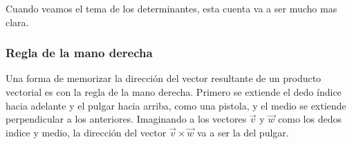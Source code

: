 \documentclass[../teoria.root.tex]{subfiles}
\begin{document}
Cuando veamos el tema de los determinantes, esta cuenta va a ser mucho mas
clara.

\subsubsection{Regla de la mano derecha}

Una forma de memorizar la dirección del vector resultante de un producto
vectorial es con la regla de la mano derecha. Primero se extiende el dedo
índice hacia adelante y el pulgar hacia arriba, como una pistola, y el medio se
extiende perpendicular a los anteriores. Imaginando a los vectores $\vec{v}$ y
$\vec{w}$ como los dedos indice y medio, la dirección del vector
$\vec{v}\times\vec{w}$ va a ser la del pulgar.
\end{document}
